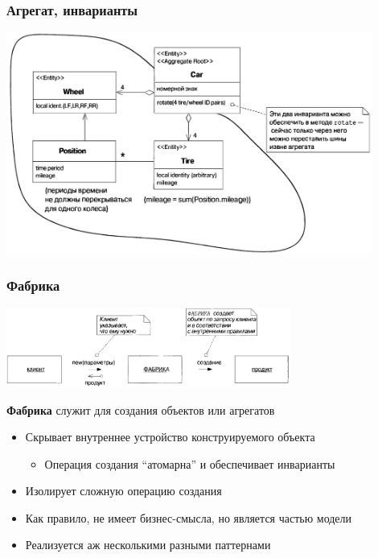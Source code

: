 \documentclass[xetex,mathserif,serif]{beamer}
\begin{document}
	\begin{frame}
		\frametitle{Агрегат, инварианты}
		\begin{center}
			\includegraphics[width=0.9\textwidth]{aggregateInvariants.png}
		\end{center}
	\end{frame}

	\begin{frame}
		\frametitle{Фабрика}
		\begin{center}
			\includegraphics[width=0.7\textwidth]{factory.png}
		\end{center}
		\textbf{Фабрика} служит для создания объектов или агрегатов
		\begin{itemize}
			\item Скрывает внутреннее устройство конструируемого объекта
			\begin{itemize}
				\item Операция создания ``атомарна'' и обеспечивает инварианты
			\end{itemize}
			\item Изолирует сложную операцию создания
			\item Как правило, не имеет бизнес-смысла, но является частью модели
			\item Реализуется аж несколькими разными паттернами
		\end{itemize}
	\end{frame}
\end{document}
